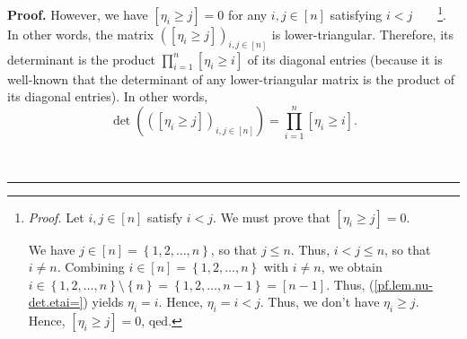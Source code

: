 \documentclass
[numbers=enddot,12pt,final,onecolumn,notitlepage,english]{scrartcl}%
\theoremstyle{definition}
\newenvironment{proof}[1][Proof]{\noindent\textbf{#1.} }{\ \rule{0.5em}{0.5em}}
\let\prodnonlimits\prod
\renewcommand{\prod}{\prodnonlimits\limits}
\newenvironment{verlong}{}{}
\begin{document}
\begin{proof}
\begin{verlong}
However, we have $\left[  \eta_{i}\geq j\right]  =0$ for any $i,j\in\left[
n\right]  $ satisfying $i<j$\ \ \ \ \footnote{\textit{Proof.} Let
$i,j\in\left[  n\right]  $ satisfy $i<j$. We must prove that $\left[  \eta
_{i}\geq j\right]  =0$.
\par
We have $j\in\left[  n\right]  =\left\{  1,2,\ldots,n\right\}  $, so that
$j\leq n$. Thus, $i<j\leq n$, so that $i\neq n$. Combining $i\in\left[
n\right]  =\left\{  1,2,\ldots,n\right\}  $ with $i\neq n$, we obtain
$i\in\left\{  1,2,\ldots,n\right\}  \setminus\left\{  n\right\}  =\left\{
1,2,\ldots,n-1\right\}  =\left[  n-1\right]  $. Thus,
(\ref{pf.lem.nu-det.etai=}) yields $\eta_{i}=i$. Hence, $\eta_{i}=i<j$. Thus,
we don't have $\eta_{i}\geq j$. Hence, $\left[  \eta_{i}\geq j\right]  =0$,
qed.}. In other words, the matrix $\left(  \left[  \eta_{i}\geq j\right]
\right)  _{i,j\in\left[  n\right]  }$ is lower-triangular. Therefore, its
determinant is the product $\prod_{i=1}^{n}\left[  \eta_{i}\geq i\right]  $ of
its diagonal entries (because it is well-known that the determinant of any
lower-triangular matrix is the product of its diagonal entries). In other
words,%
\begin{equation}
\det\left(  \left(  \left[  \eta_{i}\geq j\right]  \right)  _{i,j\in\left[
n\right]  }\right)  =\prod_{i=1}^{n}\left[  \eta_{i}\geq i\right]  .
\label{pf.lem.nu-det.c2.det=2}%
\end{equation}



\end{verlong}
\end{proof}
\end{document}
